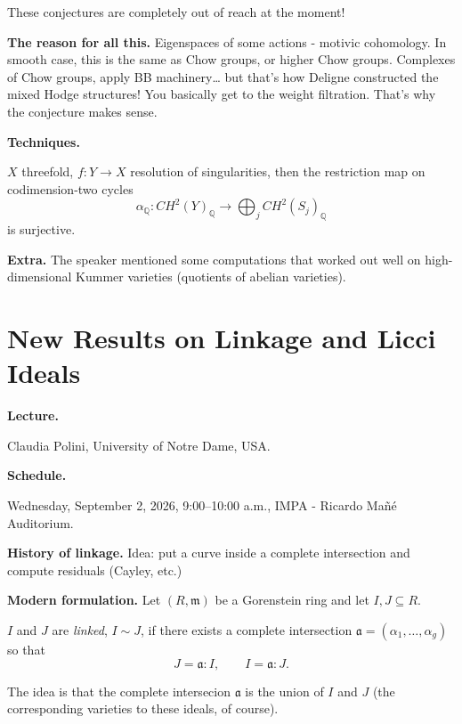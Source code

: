 \noindent
These conjectures are completely out of
reach at the moment!

\medskip\noindent
{\bf The reason for all this.}
Eigenspaces of some actions - motivic
cohomology.
In smooth case, this is the same as Chow
groups, or higher Chow groups.
Complexes of Chow groups, apply BB
machinery… but that's how Deligne
constructed the mixed Hodge structures!
You basically get to the weight filtration.
That's why the conjecture makes sense.


\medskip\noindent
{\bf Techniques.}

\begin{theorem}
\label{theorem-chow-alpha}
$X$ threefold, $f:Y \to X$ resolution of
singularities, then the restriction map on
codimension-two cycles
$$
\alpha_{\mathbb{Q}}:
CH^2(Y)_{\mathbb{Q}}
\to
\bigoplus_{j}CH^2(S_j)_{\mathbb{Q}}
$$
is surjective.
\end{theorem}

\medskip\noindent
{\bf Extra.} The speaker mentioned
some computations that worked out well
on high-dimensional Kummer varieties
(quotients of abelian varieties).




\section{New Results on Linkage and Licci
Ideals}
\label{section-linkage-licci-ideals}

\medskip\noindent
{\bf Lecture.}

Claudia Polini,
University of Notre Dame, USA.

\medskip\noindent
{\bf Schedule.}

Wednesday, September 2, 2026,
9:00--10:00 a.m.,
IMPA - Ricardo Ma\~n\'e Auditorium.

\medskip\noindent
{\bf History of linkage.} 
Idea: put a curve inside a complete
intersection
and compute residuals (Cayley, etc.)

\medskip\noindent
{\bf Modern formulation.}
Let $(R,\mathfrak{m})$ be a Gorenstein ring
and let $I,J \subseteq R$.

\begin{definition}
\label{definition-direct-link}
$I$ and $J$ are {\it linked}, $I \sim J$,
if there exists a complete intersection
$\mathfrak{a}=(\alpha_1,…,\alpha_g)$
so that
$$
J= \mathfrak{a}:I,
\qquad 
I=\mathfrak{a}:J.
$$
\end{definition}

The idea is that the complete intersecion
$\mathfrak{a}$ is the union of 
$I$ and $J$ (the corresponding varieties
to these ideals, of course).

